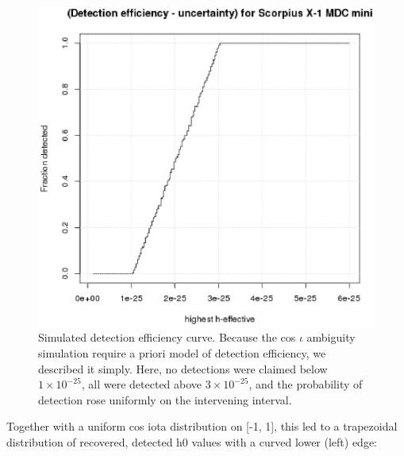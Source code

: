 \begin{figure}
\begin{center}
\includegraphics[width=0.3\paperwidth,height=0.2\paperheight]{PlotHeffDistH0DetectionEfficiency200breaks.eps}
\caption{ Simulated detection efficiency curve. Because the cos $\iota$ ambiguity simulation require a priori model of detection efficiency, we described it simply. Here, no detections were claimed below $1\times 10^{-25}$, all were detected above $3\times 10^{-25}$, and the probability of detection rose uniformly on the intervening interval.
}
\end{center}
\end{figure}


Together with a uniform cos iota distribution on [-1, 1], this led to a trapezoidal distribution of recovered, detected h0 values with a curved lower (left) edge:

